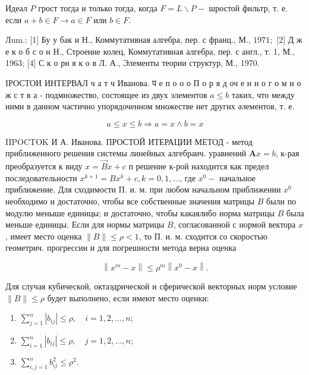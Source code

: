 \documentclass[10pt]{article}
\begin{document}
Идеал $P$ грост тогда и только тогда, когда $F=L \backslash P-$ шростой фильтр, т. е. если $a+b \in F \rightarrow a \in F$ или $b \in F$.



Лum.: [1] Бу у бак и Н., Коммутативная алгебра, пер. с франц., М., $1971 ;$ [2] Д ж е к о б с о н Н., Строение колец, Коммутативная алгебра, пер. с англ., т. 1, М., 1963; [4] С к о рн я к о в Л. А., Элементы теории структур, М., 1970.



IРОСТОИ ИНТЕРВАЛ ч а т ч Иванова. प е п о о о П о р я д оч е н н о г о м н о ж с т в а - подмножество, состоящее из двух элементов $a \leqslant b$ таких, что между ними в данном частично упорядоченном множестве нет других әлементов, т. е.



\[

a \leqslant x \leqslant b \Rightarrow a=x \wedge b=x

\]



IIPOCTOK И А. Иванова. ПРОСТОЙ ИТЕРАЦИИ МЕТОД - метод приближенного решения системы линейных алгебраич. уравнений $\boldsymbol{A} x=b$, к-рая преобразуется к виду $x=\vec{B} x+c$ п решение к-рой находится как предел последовательности $x^{k+1}=B x^{k}+c, k=0,1, \ldots$, где $x^{0}-$ начальное приближение. Для сходимости П. и. м. при любом начальном приближении $x^{0}$ необходимо и достаточно, чтобы все собственные значения матрицы $B$ были по модулю меныше единицы; и достаточно, чтобы какаялибо норма матрицы $B$ была меньше единицы. Если для нормы матрицы $B$, согласованной с нормой вектора $x$, имеет место оценка $\|B\| \leqslant \rho<1$, то П. и. м. сходится со скоростью геометрич. прогрессии и для погрешности метода верна оценка



\[

\left\|x^{m}-x\right\| \leqslant \rho^{m}\left\|x^{0}-x\right\| .

\]



Для случая кубической, октаэдрической и сферической векторных норм условие $\|B\| \leqslant \rho$ будет выполнено, если имеют место оценки:



\begin{enumerate}

  \item $\sum_{j=1}^{n}\left|b_{i j}\right| \leqslant \rho, \quad i=1,2, \ldots, n$;



  \item $\sum_{i=1}^{n}\left|b_{i j}\right| \leqslant \rho, \quad j=1,2, \ldots, n$;



  \item $\sum_{i, j=1}^{n} b_{i j}^{2} \leqslant \rho^{2}$.



\end{enumerate}
\end{document}
